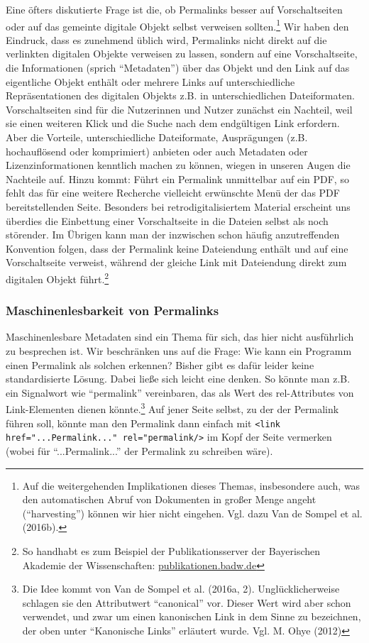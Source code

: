 \documentclass[12pt, a4paper]{article}
\begin{document}
Eine öfters diskutierte Frage ist die, ob Permalinks besser auf
Vorschaltseiten oder auf das gemeinte digitale Objekt selbst verweisen
sollten.\footnote{Auf die weitergehenden Implikationen dieses Themas,
  insbesondere auch, was den automatischen Abruf von Dokumenten in
  großer Menge angeht ("`harvesting"') können wir hier nicht eingehen.
  Vgl. dazu Van de Sompel et al. (2016b).} Wir haben den Eindruck,
dass es zunehmend üblich wird, Permalinks nicht direkt auf die
verlinkten digitalen Objekte verweisen zu lassen, sondern auf eine
Vorschaltseite, die Informationen (sprich "`Metadaten"') über das
Objekt und den Link auf das eigentliche Objekt enthält oder mehrere
Links auf unterschiedliche Repräsentationen des digitalen Objekts
z.B. in unterschiedlichen Dateiformaten. Vorschaltseiten sind für die
Nutzerinnen und Nutzer zunächst ein Nachteil, weil sie einen weiteren
Klick und die Suche nach dem endgültigen Link erfordern. Aber die
Vorteile, unterschiedliche Dateiformate, Ausprägungen
(z.B. hochauflösend oder komprimiert) anbieten oder auch Metadaten
oder Lizenzinformationen kenntlich machen zu können, wiegen in unseren
Augen die Nachteile auf. Hinzu kommt: Führt ein Permalink unmittelbar
auf ein PDF, so fehlt das für eine weitere Recherche vielleicht
erwünschte Menü der das PDF bereitstellenden Seite.  Besonders bei
retrodigitalisiertem Material erscheint uns überdies die Einbettung
einer Vorschaltseite in die Dateien selbst als noch störender. Im
Übrigen kann man der inzwischen schon häufig anzutreffenden Konvention
folgen, dass der Permalink keine Dateiendung enthält und auf eine
Vorschaltseite verweist, während der gleiche Link mit Dateiendung direkt
zum digitalen Objekt führt.\footnote{So handhabt es zum Beispiel der
  Publikationsserver der Bayerischen Akademie der Wissenschaften:
  \href{https://publikationen.badw.de}{publikationen.badw.de}}

\subsubsection{Maschinenlesbarkeit von Permalinks}
\label{maschinenlesbarkeit-von-permalinks}

Maschinenlesbare Metadaten sind ein Thema für sich, das hier nicht
ausführlich zu besprechen ist. Wir beschränken uns auf die Frage: Wie
kann ein Programm einen Permalink als solchen erkennen? Bisher gibt es
dafür leider keine standardisierte Lösung. Dabei ließe sich leicht
eine denken. So könnte man z.B. ein Signalwort wie
"`permalink"' vereinbaren, das als Wert des rel-Attributes von
Link-Elementen dienen könnte.\footnote{Die Idee kommt von Van de
  Sompel et al. (2016a, 2). Unglücklicherweise schlagen sie den
  Attributwert "`canonical"' vor. Dieser Wert wird aber schon
  verwendet, und zwar um einen kanonischen Link in dem Sinne zu
  bezeichnen, der oben unter "`Kanonische Links"' erläutert
  wurde. Vgl.  M. Ohye (2012)} Auf jener Seite selbst, zu der der
Permalink führen soll, könnte man den Permalink dann einfach mit
\texttt{<link href="...Permalink..."\ rel="permalink\dq />} im Kopf der
Seite vermerken (wobei für "`...Permalink..."' der Permalink zu schreiben wäre).
\end{document}
